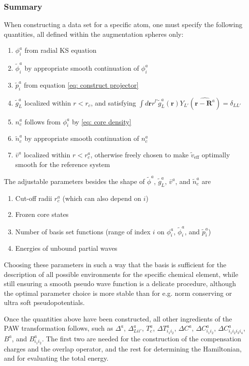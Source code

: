 \documentclass[a4paper]{article}
\newcommand{\f}[1]{\mathbf{#1}}
\newcommand{\s}[1]{\tilde{#1}}
\newcommand{\wh}[1]{\widehat{#1}}
\newcommand{\br}{\mathbf{r}}
\newcommand{\bR}{\mathbf{R}}
\begin{document}
\subsubsection*{Summary}
When constructing a data set for a specific atom, one must specify the
following quantities, all defined within the augmentation spheres
only:
%
\begin{enumerate}
\item $\phi_i^a$ from radial KS equation
\item $\s{\phi}_i^a$ by appropriate smooth continuation of $\phi_i^a$
\item $\s{p}_i^a$ from equation \ref{eq: construct projector}
\item $\s{g}_L^a$ localized within $r<r_c$, and satisfying $\int d\f{r} r^{l'} \s{g}_L^a(\f{r})Y_{L'}(\wh{\br - \bR^a}) = \delta_{LL'}$
\item $n_c^a$ follows from $\phi_i^a$ by \ref{eq: core density}
\item $\s{n}_c^a$ by appropriate smooth continuation of $n_c^a$
\item $\bar{v}^a$ localized within $r<r_c^a$, otherwise freely chosen to make $\s{v}_\text{eff}$ optimally smooth for the reference system
\end{enumerate}
%
The adjustable parameters besides the shape of $\s{\phi}^a$,
$\s{g}_L^a$, $\bar{v}^a$, and $\s{n}_c^a$ are
%
\begin{enumerate}
\item Cut-off radii $r_c^a$ (which can also depend on $i$)
\item Frozen core states
\item Number of basis set functions (range of index $i$ on $\phi_i^a$,
  $\s{\phi}_i^a$, and $\s{p}_i^a$)
\item Energies of unbound partial waves
\end{enumerate}
%
Choosing these parameters in such a way that the basis is sufficient
for the description of all possible environments for the specific
chemical element, while still ensuring a smooth pseudo wave function
is a delicate procedure, although the optimal parameter choice is more
stable than for e.g. norm conserving or ultra soft pseudopotentials.
\par Once the quantities above have been constructed, all other
ingredients of the PAW transformation follows, such as $\Delta^a$,
$\Delta_{Lii'}^a$, $T_c^a$, $\Delta T^a_{i_1i_2}$, $\Delta C^a$,
$\Delta C^a_{i_1i_2}$, $\Delta C^a_{i_1i_2i_3i_4}$, $B^a$, and
$B^a_{i_1i_2}$.  The first two are needed for the construction of the
compensation charges and the overlap operator, and the rest for
determining the Hamiltonian, and for evaluating the total energy.
\end{document}

